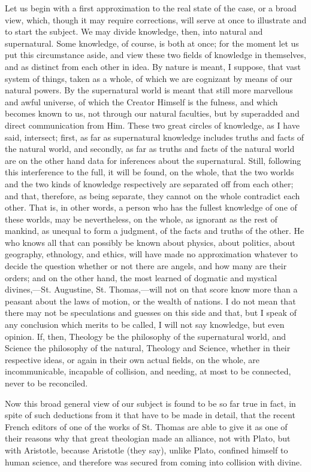 Let us begin with a first approximation to the real state of the
case, or a broad view, which, though it may require corrections, will
serve at once to illustrate and to start the subject. We may divide
knowledge, then, into natural and supernatural. Some knowledge, of
course, is both at once; for the moment let us put this circumstance
aside, and view these two fields of knowledge in themselves, and as
distinct from each other in idea. By nature is meant, I suppose, that
vast system of things, taken as a whole, of which we are cognizant by
means of our natural powers. By the supernatural world is meant that
still more marvellous and awful universe, of which the Creator Himself
is the fulness, and which becomes known to us, not through our natural
faculties, but by superadded and direct communication from Him. These
two great circles of knowledge, as I have said, intersect; first, as
far as supernatural knowledge includes truths and facts of the natural
world, and secondly, as far as truths and facts of the natural world
are on the other hand data for inferences about the supernatural.
Still, following this interference to the full, it will be found, on
the whole, that the two worlds and the two kinds of knowledge
respectively are separated off from each other; and that, therefore,
as being separate, they cannot on the whole contradict each other.
That is, in other words, a person who has the fullest knowledge of one
of these worlds, may be nevertheless, on the whole, as ignorant as the
rest of mankind, as unequal to form a judgment, of the facts and
truths of the other. He who knows all that can possibly be known about
physics, about politics, about geography, ethnology, and ethics, will
have made no approximation whatever to decide the question
whether or not there are angels, and how many are their orders; and on
the other hand, the most learned of dogmatic and mystical divines,—St.
Augustine, St. Thomas,—will not on that score know more than a
peasant about the laws of motion, or the wealth of nations. I do not
mean that there may not be speculations and guesses on this side and
that, but I speak of any conclusion which merits to be called, I will
not say knowledge, but even opinion. If, then, Theology be the
philosophy of the supernatural world, and Science the philosophy of
the natural, Theology and Science, whether in their respective ideas,
or again in their own actual fields, on the whole, are incommunicable,
incapable of collision, and needing, at most to be connected, never to
be reconciled.

Now this broad general view of our subject is found to be so far
true in fact, in spite of such deductions from it that have to be made
in detail, that the recent French editors of one of the works of St.
Thomas are able to give it as one of their reasons why that great
theologian made an alliance, not with Plato, but with Aristotle,
because Aristotle (they say), unlike Plato, confined himself to human
science, and therefore was secured from coming into collision with
divine.

